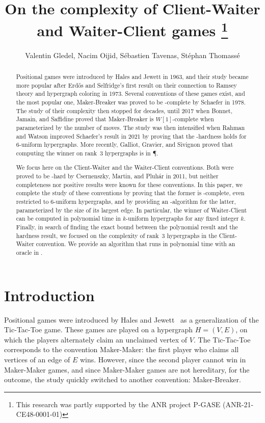 \documentclass{article}
\title{On the complexity of Client-Waiter and Waiter-Client games
\thanks{This research was partly supported by the ANR project P-GASE (ANR-21-CE48-0001-01)}
}
\author{
Valentin Gledel, Nacim Oijid, Sébastien Tavenas, Stéphan Thomassé
}
\date{}
\newcommand{\hedge}{edge\xspace}
\begin{document}
\maketitle

\begin{abstract}
    Positional games were introduced by Hales and Jewett in 1963, and their study became more popular after Erd\H os and Selfridge's first result on their connection to Ramsey theory and hypergraph coloring in 1973. Several conventions of these games exist, and the most popular one, Maker-Breaker was proved to be \PSPACE-complete by Schaefer in 1978. The study of their complexity then stopped for decades, until 2017 when Bonnet, Jamain, and Saffidine proved that Maker-Breaker is $W[1]$-complete when parameterized by the number of moves. The study was then intensified when Rahman and Watson improved Schaefer's result in 2021 by proving that the \PSPACE-hardness holds for $6$-uniform hypergraphs. More recently, Galliot, Gravier, and Sivignon proved that computing the winner on rank~$3$ hypergraphs is in \P. 
    
    We focus here on the Client-Waiter and the Waiter-Client conventions. Both were proved to be \NP-hard by Csernenszky, Martin, and Pluhár in 2011, but neither completeness nor positive results were known for these conventions. In this paper, we complete the study of these conventions by proving that the former is \PSPACE-complete, even restricted to $6$-uniform hypergraphs, and by providing an \FPT-algorithm for the latter, parameterized by the size of its largest \hedge. In particular, the winner of Waiter-Client can be computed in polynomial time in $k$-uniform hypergraphs for any fixed integer $k$. Finally, in search of finding the exact bound between the polynomial result and the hardness result, we focused on the complexity of rank~$3$ hypergraphs in the Client-Waiter convention. We provide an algorithm that runs in polynomial time with an oracle in \NP.
\end{abstract}

\section{Introduction}




Positional games were introduced by Hales and Jewett~\cite{HJ63} as a generalization of the Tic-Tac-Toe game. These games are played on a hypergraph $H = (V,E)$, on which the players alternately claim an unclaimed vertex of $V$. 
The Tic-Tac-Toe corresponds to the convention Maker-Maker: the first player who claims all vertices of an \hedge of \(E\) wins. However, since the second player cannot win in Maker-Maker games, and since Maker-Maker games are not hereditary, for the outcome, the study quickly switched to another convention: Maker-Breaker.
\end{document}
